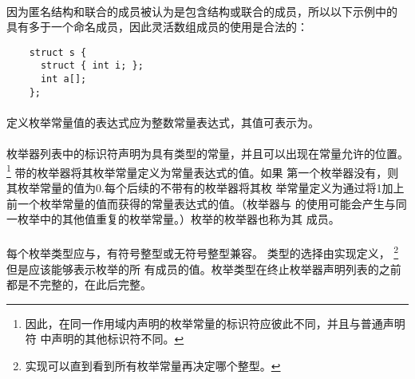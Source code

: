 \paragraph{}
\ex 因为匿名结构和联合的成员被认为是包含结构或联合的成员，所以以下示例中的
具有多于一个命名成员，因此灵活数组成员的使用是合法的：
\begin{lstlisting}
    struct s {
      struct { int i; };
      int a[];
    };
\end{lstlisting}


\syntax
\paragraph{}

\constraint
\paragraph{}
定义枚举常量值的表达式应为整数常量表达式，其值可表示为。

\semantic
\paragraph{}
枚举器列表中的标识符声明为具有类型的常量，并且可以出现在常量允许的位置。
\footnote{因此，在同一作用域内声明的枚举常量的标识符应彼此不同，并且与普通声明符
中声明的其他标识符不同。} 带\tm{=}的枚举器将其枚举常量定义为常量表达式的值。如果
第一个枚举器没有\tm{=}，则其枚举常量的值为0.每个后续的不带有\tm{=}的枚举器将其枚
举常量定义为通过将1加上前一个枚举常量的值而获得的常量表达式的值。（枚举器与
\tm{=}的使用可能会产生与同一枚举中的其他值重复的枚举常量。）枚举的枚举器也称为其
成员。

\paragraph{}
每个枚举类型应与，有符号整型或无符号整型兼容。 类型的选择由实现定义，
\footnote{实现可以直到看到所有枚举常量再决定哪个整型。} 但是应该能够表示枚举的所
有成员的值。枚举类型在终止枚举器声明列表的\tm{\}}之前都是不完整的，在此后完整。

